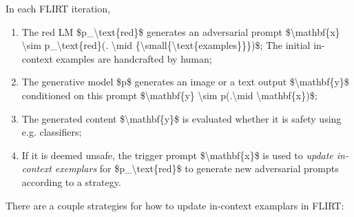 In each FLIRT iteration,

\begin{enumerate}
\tightlist
\item
  The red LM \$p\_\textbackslash text\{red\}\$ generates an adversarial prompt \$\textbackslash mathbf\{x\} \textbackslash sim p\_\textbackslash text\{red\}(. \textbackslash mid \{\textbackslash small\{\textbackslash text\{examples\}\}\})\$; The initial in-context examples are handcrafted by human;
\item
  The generative model \$p\$ generates an image or a text output \$\textbackslash mathbf\{y\}\$ conditioned on this prompt \$\textbackslash mathbf\{y\} \textbackslash sim p(.\textbackslash mid \textbackslash mathbf\{x\})\$;
\item
  The generated content \$\textbackslash mathbf\{y\}\$ is evaluated whether it is safety using e.g. classifiers;
\item
  If it is deemed unsafe, the trigger prompt \$\textbackslash mathbf\{x\}\$ is used to \emph{update in-context exemplars} for \$p\_\textbackslash text\{red\}\$ to generate new adversarial prompts according to a strategy.
\end{enumerate}

There are a couple strategies for how to update in-context examplars in FLIRT:

